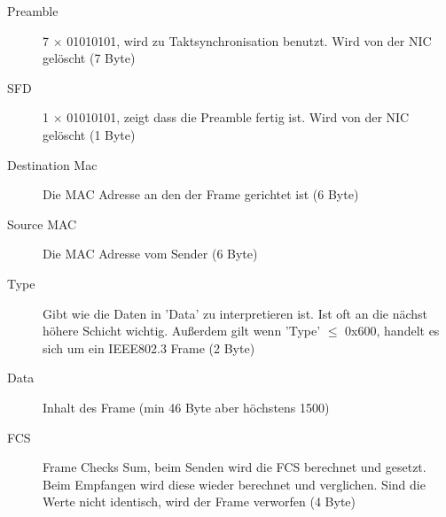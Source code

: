 \documentclass[a4paper,10pt]{scrartcl}
\begin{document}
            \begin{description}
                \item[Preamble] 7 $\times$ 01010101, wird zu Taktsynchronisation benutzt. Wird von der NIC gelöscht (7 Byte)
                \item[SFD] 1 $\times$ 01010101, zeigt dass die Preamble fertig ist. Wird von der NIC gelöscht (1 Byte)
                \item[Destination Mac] Die MAC Adresse an den der Frame gerichtet ist (6 Byte) 
                \item[Source MAC] Die MAC Adresse vom Sender (6 Byte)
                \item[Type] Gibt wie die Daten in 'Data' zu interpretieren ist. Ist oft an die nächst höhere Schicht wichtig. 
                Außerdem gilt wenn 'Type' $\leq$ 0x600, handelt es sich um ein IEEE802.3 Frame (2 Byte)
                \item[Data] Inhalt des Frame (min 46 Byte aber höchstens 1500)
                \item[FCS] Frame Checks Sum, beim Senden wird die FCS berechnet und gesetzt. Beim Empfangen wird diese wieder berechnet und verglichen. Sind die Werte nicht identisch, wird der Frame verworfen (4 Byte) 
            \end{description}
        
\end{document}
